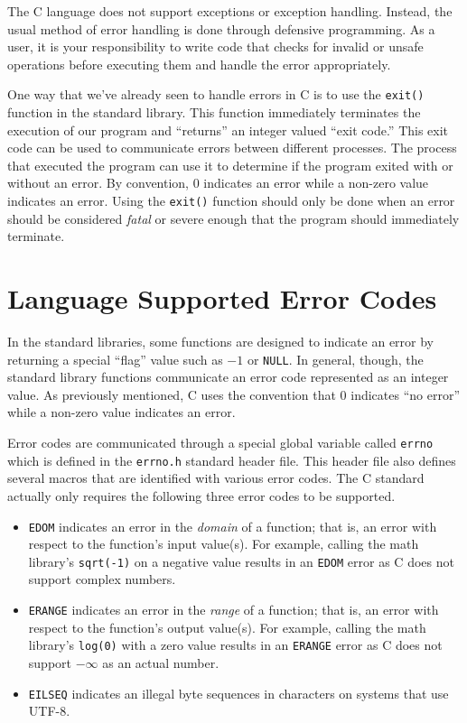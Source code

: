 

The C language does not support exceptions or exception handling.
Instead, the usual method of error handling is done through 
defensive programming.  As a user, it is your responsibility to
write code that checks for invalid or unsafe operations before
executing them and handle the error appropriately.

One way that we've already seen to handle errors in C is to use
the \texttt{exit()} function in the standard library.  This function
immediately terminates the execution of our program and ``returns''
an integer valued ``exit code.''  This exit code can be used to
communicate errors between different processes.  The process that
executed the program can use it to determine if the program exited
with or without an error.  By convention, 0 indicates an error while
a non-zero value indicates an error.  Using the \texttt{exit()} 
function should only be done when an error should be considered
\emph{fatal} or severe enough that the program should immediately
terminate.

\section{Language Supported Error Codes}
\label{section:errno}

In the standard libraries, some functions are designed to indicate an 
error by returning a special ``flag'' value such as $-1$ or 
\texttt{NULL}.  In general, though, the standard library functions
communicate an error code represented as an integer value.
As previously mentioned, C uses the convention that 0 
indicates ``no error'' while a non-zero value indicates an error.

Error codes are communicated through a special global variable called
\texttt{errno} which is defined in the \texttt{errno.h} 
standard header file.  This header file also defines several macros 
that are identified with various error codes.  The C standard actually
only requires the following three error codes to be supported.  

\begin{itemize}
  \item \texttt{EDOM} indicates an error in the \emph{domain} 
  	of a function; that is, an error with respect to the function's input value(s).
	For example, calling the math library's \texttt{sqrt(-1)} on a negative
	value results in an \texttt{EDOM} error as C does not support
	complex numbers.
  \item \texttt{ERANGE} indicates an error in the \emph{range}
  	of a function; that is, an error with respect to the function's output value(s).
	For example, calling the math library's \texttt{log(0)} with a zero
	value results in an \texttt{ERANGE} error as C does not 
	support $-\infty$ as an actual number.
  \item \texttt{EILSEQ} indicates an illegal byte sequences in 
  	characters on systems that use UTF-8.
\end{itemize}

